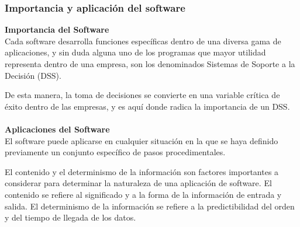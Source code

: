 \documentclass[12pt,twoside]{article}
\begin{document}
\subsubsection{Importancia y aplicación del software}
\textbf{Importancia del Software}\\

Cada software desarrolla funciones específicas dentro de una diversa gama de aplicaciones, 
y sin duda alguna uno de los programas que mayor utilidad representa dentro de una empresa, 
son los denominados Sistemas de Soporte a la Decisión (DSS).

De esta manera, la toma de decisiones se convierte en una variable crítica de éxito dentro 
de las empresas, y es aquí donde radica la importancia de un DSS. \\ \\
\textbf{Aplicaciones del Software}\\

El software puede aplicarse en cualquier situación en la que se haya definido previamente 
un conjunto específico de pasos procedimentales.

El contenido y el determinismo de la información son factores importantes a considerar 
para determinar la naturaleza de una aplicación de software. El contenido se refiere al 
significado y a la forma de la información de entrada y salida. El determinismo de la 
información se refiere a la predictibilidad del orden y del tiempo de llegada de los datos.
\end{document}
